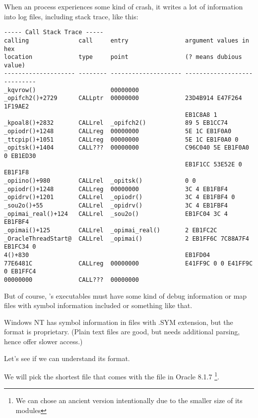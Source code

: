 \myindex{\oracle}
\label{Oracle_SYM_files_example}

When an \oracle process experiences some kind of crash, it writes a lot of information into log files,
including stack trace, like this:

\begin{lstlisting}
----- Call Stack Trace -----
calling              call     entry                argument values in hex      
location             type     point                (? means dubious value)     
-------------------- -------- -------------------- ----------------------------
_kqvrow()                     00000000             
_opifch2()+2729      CALLptr  00000000             23D4B914 E47F264 1F19AE2
                                                   EB1C8A8 1
_kpoal8()+2832       CALLrel  _opifch2()           89 5 EB1CC74
_opiodr()+1248       CALLreg  00000000             5E 1C EB1F0A0
_ttcpip()+1051       CALLreg  00000000             5E 1C EB1F0A0 0
_opitsk()+1404       CALL???  00000000             C96C040 5E EB1F0A0 0 EB1ED30
                                                   EB1F1CC 53E52E 0 EB1F1F8
_opiino()+980        CALLrel  _opitsk()            0 0
_opiodr()+1248       CALLreg  00000000             3C 4 EB1FBF4
_opidrv()+1201       CALLrel  _opiodr()            3C 4 EB1FBF4 0
_sou2o()+55          CALLrel  _opidrv()            3C 4 EB1FBF4
_opimai_real()+124   CALLrel  _sou2o()             EB1FC04 3C 4 EB1FBF4
_opimai()+125        CALLrel  _opimai_real()       2 EB1FC2C
_OracleThreadStart@  CALLrel  _opimai()            2 EB1FF6C 7C88A7F4 EB1FC34 0
4()+830                                            EB1FD04
77E6481C             CALLreg  00000000             E41FF9C 0 0 E41FF9C 0 EB1FFC4
00000000             CALL???  00000000             
\end{lstlisting}

But of course, \oracle's executables must have some kind of debug information or map files with symbol
information included or something like that.

Windows NT \oracle has symbol information in files with .SYM extension, but the format is proprietary.
(Plain text files are good, but needs additional parsing, hence offer slower access.)

Let's see if we can understand its format.

We will pick the shortest  file that comes with the  file in Oracle 8.1.7
\footnote{We can chose an ancient \oracle version intentionally due to the smaller size of its modules}.

